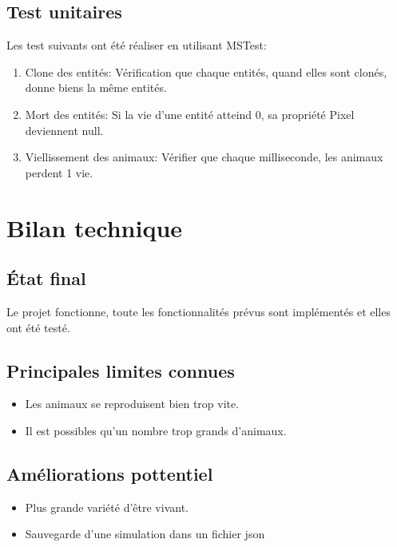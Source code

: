 \documentclass[10pt,a4paper]{article}
\begin{document}
	\subsection{Test unitaires}
	Les test suivants ont été réaliser en utilisant MSTest:
	\begin{enumerate}
		\item Clone des entités: Vérification que chaque entités, quand elles sont clonés, donne biens la même entités.
		\item Mort des entités: Si la vie d'une entité atteind 0, sa propriété Pixel deviennent null.
		\item Viellissement des animaux: Vérifier que chaque milliseconde, les animaux perdent 1 vie.
	\end{enumerate}
	
	\section{Bilan technique}
	\subsection{État final}	
	Le projet fonctionne, toute les fonctionnalités prévus sont implémentés et elles ont été testé.
	\subsection{Principales limites connues}
	\begin{itemize}	
		\item Les animaux se reproduisent bien trop vite.
		\item Il est possibles qu'un nombre trop grands d'animaux.
	\end{itemize}
	\subsection{Améliorations pottentiel}
	\begin{itemize}	
		\item Plus grande variété d'être vivant.
		\item Sauvegarde d'une simulation dans un fichier json
	\end{itemize}
	
	
	\listoffigures

	\lstlistoflistings
\end{document}
